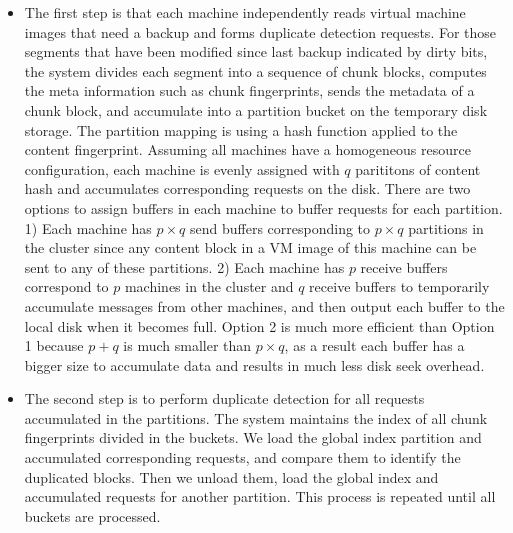 \begin{itemize}
\item
The first step is that each machine independently reads  
virtual machine images that need a backup
and forms duplicate  detection requests. For those segments that have been modified since last backup indicated by 
dirty bits,  the system divides  each segment into a sequence of chunk blocks,  computes the meta 
information such as chunk fingerprints,  sends the metadata of a chunk block, and accumulate  into 
a partition bucket on the temporary disk storage. 
The partition mapping is using a hash function applied to the content fingerprint. 
Assuming all machines have a  homogeneous resource configuration, each machine is evenly  assigned with
$q$ parititons of content hash and accumulates corresponding requests on the disk. 
There are two options to assign buffers in each machine to buffer requests for each partition.
1) Each machine has  $p\times q$ send buffers corresponding to $p\times q$ partitions in the cluster
since any content block in a VM image of this machine can be sent to any of these partitions.
2) Each machine has $p$ receive buffers correspond to $p$ machines in the cluster and $q$ receive 
buffers to temporarily accumulate messages from other machines, and then output each buffer to the local disk
when it becomes full.  Option 2 is much more efficient than Option 1 because $p+q$ is much smaller than
$p\times q$, as a result each buffer has a bigger size to accumulate data and results in 
much less disk seek overhead.

\item
The second step is to perform duplicate detection for  all requests accumulated in the partitions.  
The system maintains the index of all chunk fingerprints divided in the buckets. We load the global index partition 
and accumulated corresponding requests, and compare them to  identify the duplicated blocks.  
Then we unload them, load the global index and accumulated requests for another partition. 
This process is repeated until all buckets are processed.


\end{itemize}

